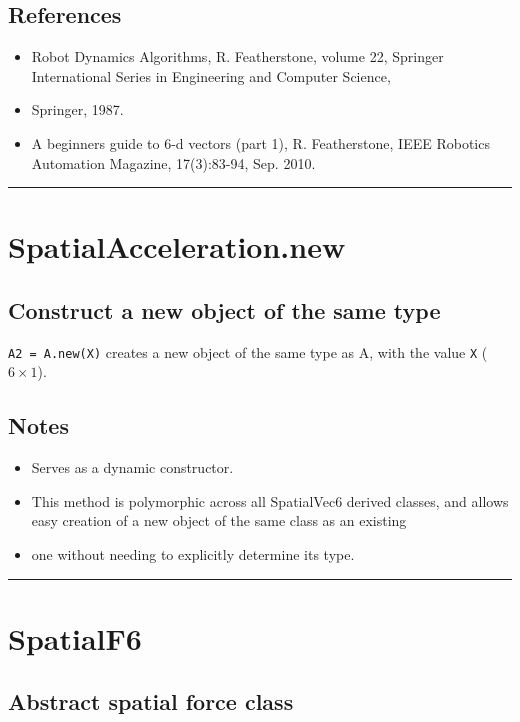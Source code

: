\subsection*{References}
\begin{itemize}
  \item Robot Dynamics Algorithms, R. Featherstone, volume 22,     Springer International Series in Engineering and Computer Science,
  \item Springer, 1987.
  \item A beginner\textquotesingle s guide to 6-d vectors (part 1), R. Featherstone,     IEEE Robotics Automation Magazine, 17(3):83-94, Sep. 2010.
\end{itemize}
\vspace{1.5ex}\hrule

\hypertarget{SpatialAcceleration.new}{\section*{SpatialAcceleration.new}}
\subsection*{Construct a new object of the same type}


\texttt{A2 = A.new(X)} creates a new object of the same type as A, with the value
\texttt{X} ($6 \times 1$).


\subsection*{Notes}
\begin{itemize}
  \item Serves as a dynamic constructor.
  \item This method is polymorphic across all SpatialVec6 derived classes, and     allows easy creation of a new object of the same class as an existing
  \item one without needing to explicitly determine its type.
\end{itemize}
\vspace{1.5ex}\rule{\textwidth}{1mm}

\hypertarget{SpatialF6}{\section*{SpatialF6}}
\subsection*{Abstract spatial force class}


